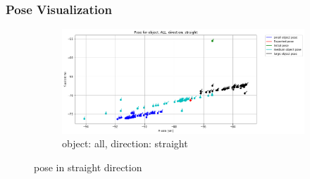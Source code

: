 \documentclass[10pt,a4paper]{article}
\begin{document}
						 \subsubsection{Pose Visualization}
								
								\begin{figure}[H]
%									
									
									\begin{subfigure}{\textwidth}
										\centering
										\includegraphics[width=0.8\linewidth]{img/pose_all_straight.png}
										\caption{object: all, direction: straight}
										\label{fig:object: all, direction: straight}
									\end{subfigure}
									
									\caption{pose in straight direction}
									\label{fig:pose in straight direction}
								\end{figure}
								
\end{document}
